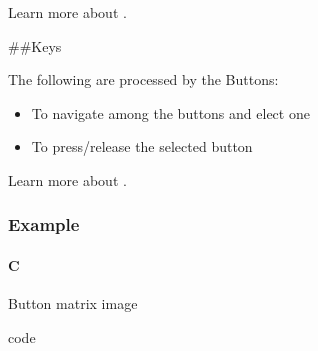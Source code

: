 \documentclass[letterpaper,10pt,english]{sphinxmanual}
\begin{document}
Learn more about {\hyperref[\detokenize{overview/events::doc}]{}}.

\#\#Keys

The following  are processed by the Buttons:
\begin{itemize}
\item {} 
 To navigate among the buttons and elect one

\item {} 
 To press/release the selected button

\end{itemize}

Learn more about {\hyperref[\detokenize{overview/indev::doc}]{}}.


\subsubsection{Example}
\label{\detokenize{object-types/btnm:example}}

\paragraph{C}
\label{\detokenize{object-types/btnm:c}}
Button matrix image

code
\end{document}
